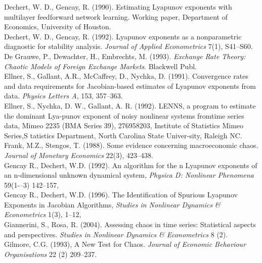 \documentclass[12pt]{article}
\begin{document}
\noindent Dechert, W. D., Gencay, R. (1990).
Estimating Lyapunov exponents with multilayer feedforward network learning. Working paper, Department of Economics, University of Houston.
\newline{}\\
\noindent Dechert, W. D., Gencay, R. (1992).  Lyapunov exponents as a nonparametric diagnostic for stability analysis. \emph{Journal of Applied Econometrics} 7(1), S41--S60. 
\newline{}\\
\noindent De Grauwe, P., Dewachter, H., Embrechts, M. (1993). \emph{Exchange Rate Theory: Chaotic Models of Foreign Exchange Markets}. Blackwell Publ.
\newline{}\\
\noindent Ellner, S., Gallant, A.R., McCaffrey,  D., Nychka, D. (1991).
Convergence rates and data requirements for Jacobian-based estimates of Lyapunov exponents from data.
\emph{Physics Letters A}, 153, 357--363.
\newline{}\\
\noindent Ellner, S., Nychka, D. W., Gallant, A. R. (1992). LENNS, a program to estimate the dominant Lya-punov exponent of noisy nonlinear systems fromtime series data, Mimeo 2235 (BMA Series 39), 276958203, Institute of Statistics Mimeo Series,S tatistics Department, North Carolina State Univer-sity, Raleigh NC. 
\newline{}\\
\noindent Frank, M.Z., Stengos, T. (1988). Some evidence concerning macroeconomic chaos. \emph{Journal of Monetary Economics}
22(3), 423--438.
\newline{}\\
\noindent Gencay R., Dechert, W.D. (1992). An algorithm for the n Lyapunov exponents of an n-dimensional unknown dynamical system,
\emph{Physica D: Nonlinear Phenomena} 59(1-–3) 142--157,
\newline{}\\
\noindent Gencay R., Dechert, W.D. (1996). The Identification of Spurious Lyapunov Exponents in Jacobian Algorithms, \emph{Studies in Nonlinear Dynamics \& Econometrics} 1(3), 1--12,
\newline{}\\
\noindent Giannerini, S., Rosa,  R. (2004).  Assessing chaos in time series: Statistical aspects and perspectives.  \emph{Studies in Nonlinear Dynamics \& Econometrics} 8 (2).
\newline{}\\
\noindent Gilmore,  C.G. (1993), A New Test for Chaos. \emph{Journal of Economic Behaviour Organisations} 22 (2) 209--237.
\end{document}
